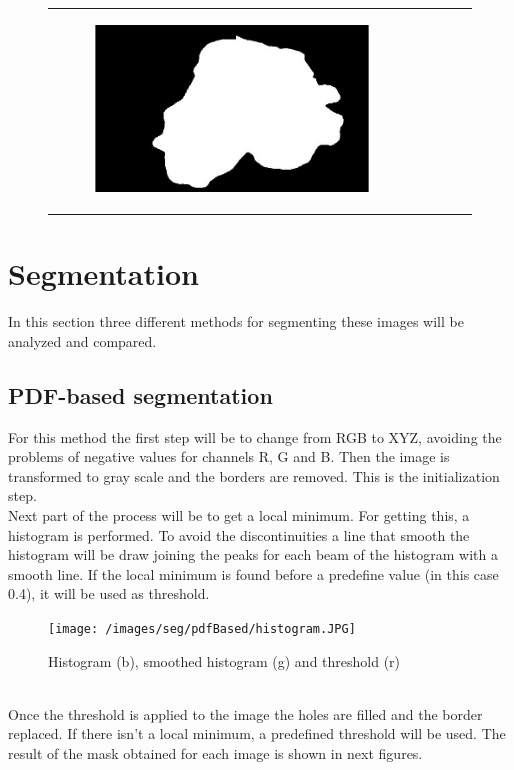 \documentclass[a4paper, 10pt, conference]{ieeeconf}        %
\begin{document}
\begin{figure}[ht!]
\begin{tabular}{c c c c c}
\begin{subfigure}{0.2\textwidth}
        \end{subfigure} 
       \begin{subfigure}{0.2\textwidth}
        \includegraphics[scale=0.2]{finalGroundTrue_08.JPG}
        \end{subfigure} \\
 \end{tabular}

\end{figure}    
\clearpage
\section{Segmentation}
In this section three different methods for segmenting these images will be analyzed and compared.
\subsection{PDF-based segmentation}
For this method the first step will be to change from RGB to XYZ, avoiding the problems of negative values for channels R, G and B. Then the image is transformed to gray scale and the borders are removed. This is the initialization step. \\
Next part of the process will be to get a local minimum. For getting this, a histogram is performed. To avoid the discontinuities a line that smooth the histogram will be draw joining the peaks for each beam of the histogram with a smooth line. 
If the local minimum is found before a predefine value (in this case 0.4), it will be used as threshold.\\
\begin{figure}[ht!]
 \texttt{[image: /images/seg/pdfBased/histogram.JPG]}\caption{Histogram (b), smoothed histogram (g) and threshold (r)}
\end{figure} \\
Once the threshold is applied to the image the holes are filled and the border replaced.
If there isn't a local minimum, a predefined threshold will be used. 
The result of the mask obtained for each image is shown in next figures.
\end{document}
